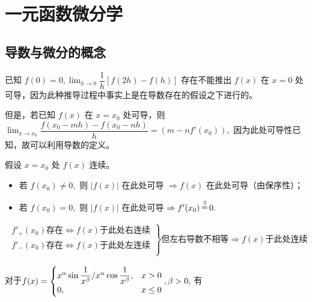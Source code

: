 \chapter{一元函数微分学}

\section{导数与微分的概念}


已知 $ f(0) = 0,{\displaystyle\lim_{h\rightarrow 0}}\dfrac{1}{h}[f(2h)-f(h)] $ 存在不能推出
$ f(x) $ 在 $ x = 0 $ 处可导，因为此种推导过程中事实上是在导数存在的假设之下进行的。

但是，若已知 $ f(x) $ 在 $ x = x_0 $ 处可导，则 $ {\displaystyle\lim_{x\rightarrow x_0}}
\dfrac{f(x_0 - mh) - f(x_0-nh)}{h} = (m-n f'(x_0)), $ 因为此处可导性已知，故可以利用导数的定义。


假设 $ x = x_0 $ 处 $ f(x) $ 连续。

\begin{itemize}
    \item 若 $ f(x_0)\neq 0, $ 则 $ |f(x)| $ 在此处可导 $ \Rightarrow f(x) $ 在此处可导（由保序性）；
    \item 若 $ f(x_0)= 0, $ 则 $ |f(x)| $ 在此处可导 $ \Rightarrow f'(x_0)\mathop=\limits^{\exists} 0. $ 
\end{itemize}


\begin{equation*}
    \begin{aligned}
        \left.\begin{matrix}
            f'_+(x_0)\textrm{存在}\Leftrightarrow f(x)\textrm{于此处右连续}\\
            f'_-(x_0)\textrm{存在}\Leftrightarrow f(x)\textrm{于此处左连续}\\
        \end{matrix}\right\}\textrm{但左右导数不相等}\Rightarrow f(x)\textrm{于此处连续}
    \end{aligned}
\end{equation*}


对于$ \displaystyle f(x) = \begin{cases}
    x^\alpha \sin \dfrac{1}{x^\beta} / x^\alpha \cos \dfrac{1}{x^\beta},
    & x > 0 \\ 0, & x \leq 0
\end{cases}, \beta > 0, $ 有


